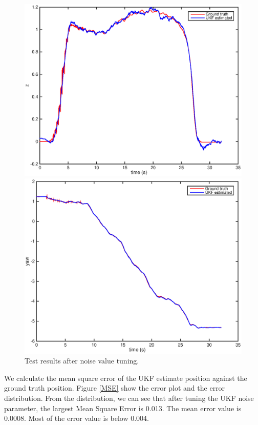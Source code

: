 \documentclass[letter, 10pt]{article}
\begin{document}
\begin{onehalfspacing}
\begin{figure}[h]
\begin{minipage}{.25\textwidth}
    		\includegraphics[width=1\linewidth]{t_z.eps}
	\end{minipage}%
	\begin{minipage}{.25\textwidth}  
		\centering
    		\includegraphics[width=1\linewidth]{t_yaw.eps}
	\end{minipage}
	\centering
	\caption{Test results after noise value tuning.}
	\label{tuning}
\end{figure}

We calculate the mean square error of the UKF estimate position against the ground truth position. Figure \ref{MSE} show the error plot and the error distribution. From the distribution, we can see that after tuning the UKF noise parameter, the largest Mean Square Error is 0.013. The mean error value is 0.0008. Most of the error value is below 0.004. 


\end{onehalfspacing}
\end{document}
